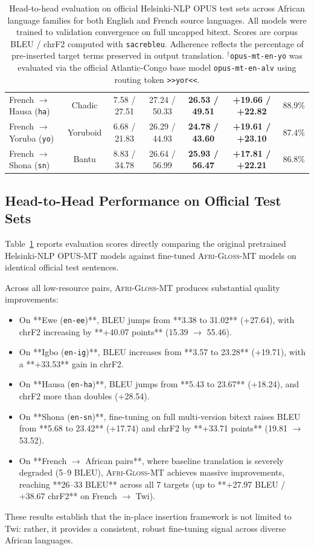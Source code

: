 \documentclass[10pt,twocolumn]{article}
\newcommand{\agm}{\textsc{Afri-Gloss-MT}}
\begin{document}
\begin{table}[t]
\begin{tabular}{lcccccc}
French $\rightarrow$ Hausa (\texttt{ha}) & Chadic & 7.58 / 27.51 & 27.24 / 50.33 & \textbf{26.53 / 49.51} & \textbf{+19.66 / +22.82} & 88.9\% \\
French $\rightarrow$ Yoruba (\texttt{yo}) & Yoruboid & 6.68 / 21.83 & 26.29 / 44.93 & \textbf{24.78 / 43.60} & \textbf{+19.61 / +23.10} & 87.4\% \\
French $\rightarrow$ Shona (\texttt{sn}) & Bantu & 8.83 / 34.78 & 26.64 / 56.99 & \textbf{25.93 / 56.47} & \textbf{+17.81 / +22.21} & 86.8\% \\
\bottomrule
\end{tabular}
\caption{Head-to-head evaluation on official Helsinki-NLP OPUS test sets across African language families for both English and French source languages. All models were trained to validation convergence on full uncapped bitext. Scores are corpus BLEU / chrF2 computed with \texttt{sacrebleu}. Adherence reflects the percentage of pre-inserted target terms preserved in output translation. $^\dagger$\texttt{opus-mt-en-yo} was evaluated via the official Atlantic-Congo base model \texttt{opus-mt-en-alv} using routing token \texttt{>>yor<<}.}
\label{tab:official_bench}
\end{table}

\subsection{Head-to-Head Performance on Official Test Sets}
Table~\ref{tab:official_bench} reports evaluation scores directly comparing the original pretrained Helsinki-NLP OPUS-MT models against fine-tuned \agm{} models on identical official test sentences.

Across all low-resource pairs, \agm{} produces substantial quality improvements:
\begin{itemize}
    \item On **Ewe (\texttt{en-ee})**, BLEU jumps from **3.38 to 31.02** (+27.64), with chrF2 increasing by **+40.07 points** (15.39 $\rightarrow$ 55.46).
    \item On **Igbo (\texttt{en-ig})**, BLEU increases from **3.57 to 23.28** (+19.71), with a **+33.53** gain in chrF2.
    \item On **Hausa (\texttt{en-ha})**, BLEU jumps from **5.43 to 23.67** (+18.24), and chrF2 more than doubles (+28.54).
    \item On **Shona (\texttt{en-sn})**, fine-tuning on full multi-version bitext raises BLEU from **5.68 to 23.42** (+17.74) and chrF2 by **+33.71 points** (19.81 $\rightarrow$ 53.52).
    \item On **French $\rightarrow$ African pairs**, where baseline translation is severely degraded (5--9 BLEU), \agm{} achieves massive improvements, reaching **26--33 BLEU** across all 7 targets (up to **+27.97 BLEU / +38.67 chrF2** on French $\rightarrow$ Twi).
\end{itemize}
These results establish that the in-place insertion framework is not limited to Twi: rather, it provides a consistent, robust fine-tuning signal across diverse African languages.
\end{document}
